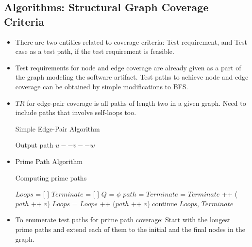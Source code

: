 \documentclass[a4paper]{article}
\begin{document}
\subsection{Algorithms: Structural Graph Coverage Criteria}
\begin{itemize}
    \item There are two entities related to coverage criteria: Test requirement, and Test case as a test path, if the test requirement is feasible.
    \item Test requirements for node and edge coverage are already given as a part of the graph modeling the software artifact. Test paths to achieve node and edge coverage can be obtained by simple modifications to BFS.
    \item $TR$ for edge-pair coverage is all paths of length two in a given graph. Need to include paths that involve self-loops too.
    \begin{algorithm}[H]
        \caption{Simple Edge-Pair Algorithm}
        \begin{algorithmic}[1]
                        \State Output path $u--v--w$
                    \EndFor
                \EndFor
            \EndFor
        \end{algorithmic}
    \end{algorithm}
    \item Prime Path Algorithm
    \begin{algorithm}[H]
        \caption{Computing prime paths}
        \begin{algorithmic}[1]
            \State $Loops$ = [ ]
            \State $Terminate$ = [ ]
            \State $Q$ = $\phi$
                \State {}
            \EndFor
                \State $path$ = 
                        \State $Terminate$ = $Terminate$ ++ ($path$ ++ $v$)
                        \State $Loops$ = $Loops$ ++ ($path$ ++ $v$)
                        \State continue
                    \Else
                        \State {}
                    \EndIf
                \EndFor
            \EndWhile
            \State \Return $Loops$, $Terminate$
        \end{algorithmic}
    \end{algorithm}
    \item To enumerate test paths for prime path coverage: Start with the longest prime paths and extend each of them to the initial and the final nodes in the graph.
\end{itemize}
\end{document}
